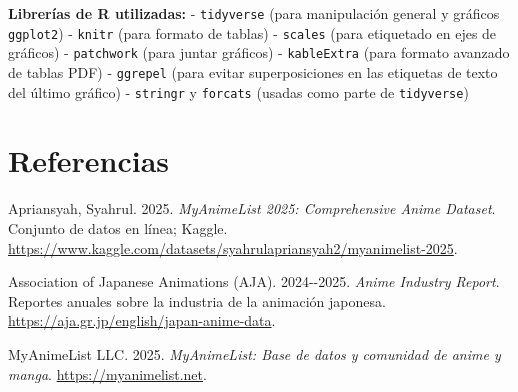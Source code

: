 \documentclass[
  spanish,
  11pt,
  letterpaper,
]{article}
\newlength{\cslhangindent}
\newenvironment{CSLReferences}[2] %
 {\begin{list}{}{%
  \setlength{\itemindent}{0pt}
  \setlength{\leftmargin}{0pt}
  \setlength{\parsep}{0pt}
  \ifodd #1
   \setlength{\leftmargin}{\cslhangindent}
   \setlength{\itemindent}{-1\cslhangindent}
  \fi
  \setlength{\itemsep}{#2\baselineskip}}}
 {\end{list}}
\begin{document}
\textbf{Librerías de R utilizadas:} - \texttt{tidyverse} (para
manipulación general y gráficos \texttt{ggplot2}) - \texttt{knitr} (para
formato de tablas) - \texttt{scales} (para etiquetado en ejes de
gráficos) - \texttt{patchwork} (para juntar gráficos) -
\texttt{kableExtra} (para formato avanzado de tablas PDF) -
\texttt{ggrepel} (para evitar superposiciones en las etiquetas de texto
del último gráfico) - \texttt{stringr} y \texttt{forcats} (usadas como
parte de \texttt{tidyverse})

\section*{Referencias}\label{referencias}

\protect{}\label{refs}
\begin{CSLReferences}{1}{1}
Apriansyah, Syahrul. 2025. \emph{{MyAnimeList 2025}: Comprehensive
{A}nime {D}ataset}. Conjunto de datos en línea; Kaggle.
\url{https://www.kaggle.com/datasets/syahrulapriansyah2/myanimelist-2025}.

Association of Japanese Animations (AJA). 2024-\/-2025. \emph{Anime
Industry Report}. Reportes anuales sobre la industria de la animación
japonesa. \url{https://aja.gr.jp/english/japan-anime-data}.

MyAnimeList LLC. 2025. \emph{{MyAnimeList}: Base de datos y comunidad de
anime y manga}. \url{https://myanimelist.net}.

\end{CSLReferences}
\end{document}
